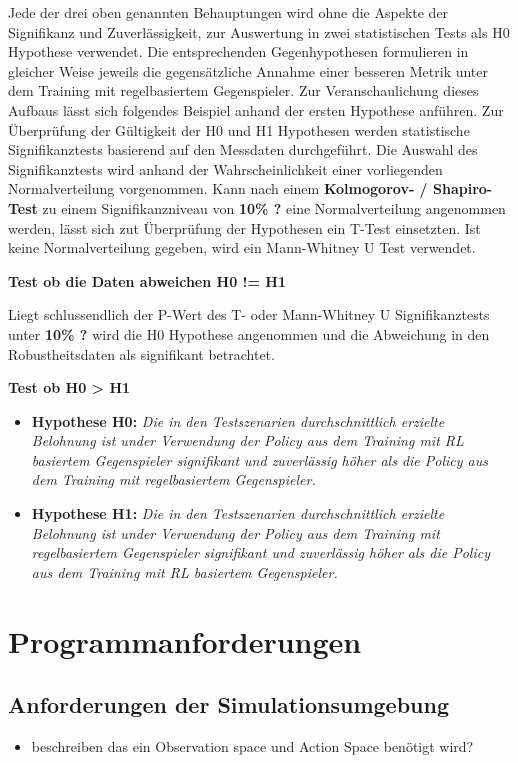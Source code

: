 Jede der drei oben genannten Behauptungen wird ohne die Aspekte der Signifikanz und Zuverlässigkeit, zur Auswertung in zwei statistischen Tests als H0 Hypothese verwendet.
Die entsprechenden Gegenhypothesen formulieren in gleicher Weise jeweils die gegensätzliche Annahme einer besseren Metrik unter dem Training mit regelbasiertem Gegenspieler. 
Zur Veranschaulichung dieses Aufbaus lässt sich folgendes Beispiel anhand der ersten Hypothese anführen. 
Zur Überprüfung der Gültigkeit der H0 und H1 Hypothesen werden statistische Signifikanztests basierend auf den Messdaten durchgeführt. 
Die Auswahl des Signifikanztests wird anhand der Wahrscheinlichkeit einer vorliegenden Normalverteilung vorgenommen.
Kann nach einem \textbf{Kolmogorov- / Shapiro- Test} zu einem Signifikanzniveau von \textbf{10\% ?} eine Normalverteilung angenommen werden, lässt sich zut Überprüfung der Hypothesen ein T-Test einsetzten.
Ist keine Normalverteilung gegeben, wird ein Mann-Whitney U Test verwendet.

\textbf{Test ob die Daten abweichen H0 != H1}

Liegt schlussendlich der P-Wert des T- oder Mann-Whitney U Signifikanztests unter \textbf{10\% ?} wird die H0 Hypothese angenommen und die Abweichung in den Robustheitsdaten als signifikant betrachtet.

\textbf{Test ob H0 > H1}

\begin{itemize}
    \item \textbf{Hypothese H0:} \textit{Die in den Testszenarien durchschnittlich erzielte Belohnung ist under Verwendung der Policy aus dem Training mit RL basiertem Gegenspieler signifikant und zuverlässig höher als die Policy aus dem Training mit regelbasiertem Gegenspieler.}
    \item \textbf{Hypothese H1:} \textit{Die in den Testszenarien durchschnittlich erzielte Belohnung ist under Verwendung der Policy aus dem Training mit regelbasiertem Gegenspieler signifikant und zuverlässig höher als die Policy aus dem Training mit RL basiertem Gegenspieler.}
\end{itemize}


\section{Programmanforderungen}
\subsection{Anforderungen der Simulationsumgebung}
\begin{itemize}
    \item beschreiben das ein Observation space und Action Space benötigt wird?
\end{itemize}

